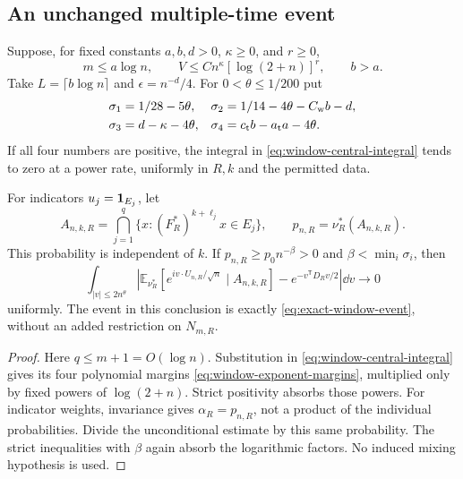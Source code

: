 \subsection{An unchanged multiple-time event}
\begin{corollary}
\label{cor:logarithmic-window-conditioning}
Suppose, for fixed constants $a,b,d>0$, $\kappa\ge0$, and $r\ge0$,
\[
 m\le a\log n,
 \qquad V\le C n^\kappa[\log(2+n)]^r,
 \qquad b>a.
\]
Take $L=\lceil b\log n\rceil$ and $\epsilon=n^{-d}/4$.
For $0<\theta\le1/200$ put
\begin{align}
 \sigma_1&=1/28-5\theta,&
 \sigma_2&=1/14-4\theta-C_{\mathrm w}b-d,\notag\\
 \sigma_3&=d-\kappa-4\theta,&
 \sigma_4&=c_{\mathrm t}b-a_{\mathrm t}a-4\theta.
       \label{eq:window-exponent-margins}
\end{align}
If all four numbers are positive, the integral in
\eqref{eq:window-central-integral} tends to zero at a power rate,
uniformly in $R,k$ and the permitted data.

For indicators $u_j=\mathbf1_{E_j}$, let
\begin{equation}\label{eq:exact-window-event}
 A_{n,k,R}=\bigcap_{j=1}^{q}
       \{x:(F_R^*)^{k+\ell_j}x\in E_j\},\qquad
 p_{n,R}=\nu_R^*(A_{n,k,R}).
\end{equation}
This probability is independent of $k$. If
$p_{n,R}\ge p_0n^{-\beta}>0$ and
$\beta<\min_i\sigma_i$, then
\begin{equation}\label{eq:conditioned-window-band}
 \int_{|v|\le2n^\theta}
 \left|\mathbb E_{\nu_R^*}
   [e^{iv\cdot U_{n,R}/\sqrt n}\mid A_{n,k,R}]
                      -e^{-v^{\mathsf T}D_Rv/2}\right|\dd v
                         \longrightarrow0
\end{equation}
uniformly. The event in this conclusion is exactly
\eqref{eq:exact-window-event}, without an added restriction on
$N_{m,R}$.
\end{corollary}
\begin{proof}
Here $q\le m+1=O(\log n)$. Substitution in
\eqref{eq:window-central-integral} gives its four polynomial margins
\eqref{eq:window-exponent-margins}, multiplied only by fixed powers
of $\log(2+n)$. Strict positivity absorbs those powers. For indicator
weights, invariance gives $\alpha_R=p_{n,R}$, not a product of the
individual probabilities. Divide the unconditional estimate by this
same probability. The strict inequalities with $\beta$ again absorb
the logarithmic factors. No induced mixing hypothesis is used.
\end{proof}


